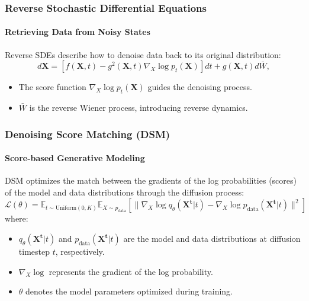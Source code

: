 \documentclass[light]{lutbeamer} %
\begin{document}
\begin{frame}
    \frametitle{Reverse Stochastic Differential Equations}
    \framesubtitle{Retrieving Data from Noisy States}

    Reverse SDEs describe how to denoise data back to its original distribution:
    \begin{equation}
        d\mathbf{X} = \left[f(\mathbf{X}, t) - g^2(\mathbf{X}, t)\nabla_X \log p_t(\mathbf{X})\right]dt + g(\mathbf{X}, t)d\bar{W},
    \end{equation}
    \begin{itemize}
        \item The score function \(\nabla_X \log p_t(\mathbf{X})\) guides the denoising process.
        \item \(\bar{W}\) is the reverse Wiener process, introducing reverse dynamics.
    \end{itemize}
\end{frame}

\begin{frame}
    \frametitle{Denoising Score Matching (DSM)}
    \framesubtitle{Score-based Generative Modeling}

    DSM optimizes the match between the gradients of the log probabilities (scores) of the model and data distributions through the diffusion process:
    \begin{equation}
        \mathcal{L}(\theta) = \mathbb{E}_{t \sim \text{Uniform}(0, K)} \mathbb{E}_{X \sim p_{\text{data}}} [\|\nabla_X \log q_{\theta}(\mathbf{X^t} | t) - \nabla_X \log p_{\text{data}}(\mathbf{X^t} | t)\|^2]
    \end{equation}
    where:
    \begin{itemize}
        \item \( q_{\theta}(\mathbf{X^t} | t) \) and \( p_{\text{data}}(\mathbf{X^t} | t) \) are the model and data distributions at diffusion timestep \(t\), respectively.
        \item \( \nabla_X \log \) represents the gradient of the log probability.
        \item \( \theta \) denotes the model parameters optimized during training.
    \end{itemize}
\end{frame}
\end{document}
